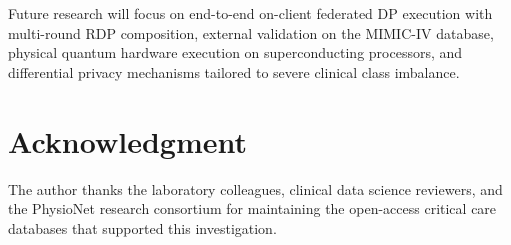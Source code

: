 \documentclass[conference]{IEEEtran}
\begin{document}
Future research will focus on end-to-end on-client federated DP execution with multi-round RDP composition, external validation on the MIMIC-IV database, physical quantum hardware execution on superconducting processors, and differential privacy mechanisms tailored to severe clinical class imbalance.

\section*{Acknowledgment}
The author thanks the laboratory colleagues, clinical data science reviewers, and the PhysioNet research consortium for maintaining the open-access critical care databases that supported this investigation.

\let\oldthebibliography\thebibliography
\let\endoldthebibliography\endthebibliography
\renewenvironment{thebibliography}[1]{%
  \begin{oldthebibliography}{#1}%
    \footnotesize
    \setlength{\itemsep}{0.8pt plus 0.3pt minus 0.3pt}%
    \setlength{\parsep}{0pt}%
}{%
  \end{oldthebibliography}%
}



\end{document}
